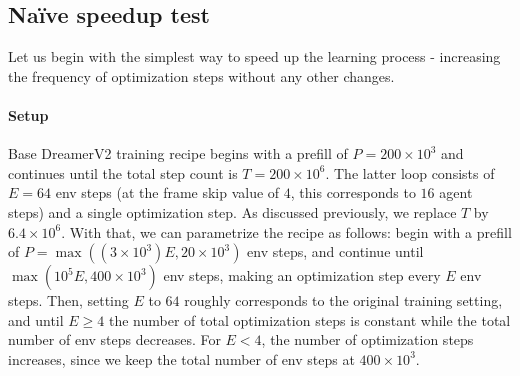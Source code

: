 \documentclass[twoside,11pt]{article}
\begin{document}
\subsection{Na\"ive speedup test}

Let us begin with the simplest way to speed up the learning process - increasing the frequency of optimization steps without any other changes.

\paragraph{Setup} Base DreamerV2 training recipe begins with a prefill of $P = 200 \times 10^3$ and continues until the total step count is $T = 200 \times 10^6$. The latter loop consists of $E = 64$ env steps (at the frame skip value of $4$, this corresponds to $16$ agent steps) and a single optimization step. As discussed previously, we replace $T$ by $6.4 \times 10^6$. With that, we can parametrize the recipe as follows: begin with a prefill of $P = \max((3 \times 10^3)E, 20 \times 10^3)$ env steps, and continue until $\max(10^5 E, 400 \times 10^3)$ env steps, making an optimization step every $E$ env steps. Then, setting $E$ to $64$ roughly corresponds to the original training setting, and until $E \geq 4$ the number of total optimization steps is constant while the total number of env steps decreases. For $E < 4$, the number of optimization steps increases, since we keep the total number of env steps at $400 \times 10^3$.



\vskip 0.2in

\end{document}
